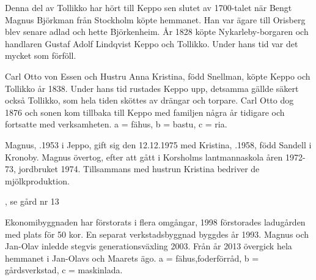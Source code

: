 Denna del av Tollikko har hört till Keppo sen slutet av 1700-talet när Bengt Magnus Björkman från Stockholm köpte hemmanet. Han var ägare till Orisberg blev senare adlad och hette Björkenheim. År 1828 köpte Nykarleby-borgaren och handlaren Gustaf Adolf Lindqvist Keppo och Tollikko. Under hans tid var det mycket som förföll.


Carl Otto von Essen och Hustru Anna Kristina, född Snellman, köpte Keppo och Tollikko år 1838. Under hans tid rustades Keppo upp, detsamma gällde säkert också Tollikko, som hela tiden sköttes av drängar och torpare. Carl Otto dog 1876 och sonen kom tillbaka till Keppo med familjen några år tidigare och fortsatte med 	verksamheten. a = fähus, b = bastu, c = ria.






Magnus, .1953 i Jeppo, gift sig den 12.12.1975 med Kristina, .1958, född Sandell i Kronoby. Magnus övertog, efter att gått i Korsholms lantmannaskola åren 1972-73, jordbruket 1974. Tillsammans med hustrun Kristina bedriver de mjölkproduktion.
\begin{jhchildren}
  \item {}, se gård nr 13
  \item {}
  \item {}
  \item {}
  \item {}
  \item {}
  \item {}
  \item {}
  \item {}
\end{jhchildren}
Ekonomibyggnaden har förstorats i flera omgångar, 1998 förstorades ladugården med plats för 50 kor. En separat verkstadsbyggnad byggdes år 1993. Magnus och Jan-Olav inledde stegvis generationsväxling 2003. Från år 2013 övergick hela hemmanet i Jan-Olavs och Maarets ägo. a = fähus,foderförråd, b = gårdsverkstad, c = maskinlada.


